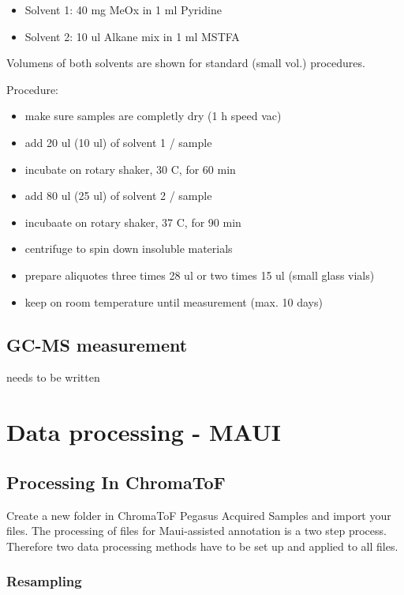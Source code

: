 \documentclass[]{book}
\providecommand{\tightlist}{%
  \setlength{\itemsep}{0pt}\setlength{\parskip}{0pt}}
\theoremstyle{definition}
\theoremstyle{definition}
\theoremstyle{definition}
\theoremstyle{remark}
\begin{document}
\begin{itemize}
\tightlist
\item
  Solvent 1: 40 mg MeOx in 1 ml Pyridine
\item
  Solvent 2: 10 ul Alkane mix in 1 ml MSTFA
\end{itemize}

Volumens of both solvents are shown for standard (small vol.)
procedures.

Procedure:

\begin{itemize}
\tightlist
\item
  make sure samples are completly dry (1 h speed vac)
\item
  add 20 ul (10 ul) of solvent 1 / sample
\item
  incubate on rotary shaker, 30 C, for 60 min
\item
  add 80 ul (25 ul) of solvent 2 / sample
\item
  incubaate on rotary shaker, 37 C, for 90 min
\item
  centrifuge to spin down insoluble materials
\item
  prepare aliquotes three times 28 ul or two times 15 ul (small glass
  vials)
\item
  keep on room temperature until measurement (max. 10 days)
\end{itemize}

\section{GC-MS measurement}\label{gc-ms-measurement}

needs to be written

\chapter{Data processing - MAUI}\label{mauiproc}

\section{Processing In ChromaToF}\label{processing-in-chromatof}

Create a new folder in ChromaToF Pegasus Acquired Samples and import
your files. The processing of files for Maui-assisted annotation is a
two step process. Therefore two data processing methods have to be set
up and applied to all files.

\subsection{Resampling}\label{resampling}
\end{document}
